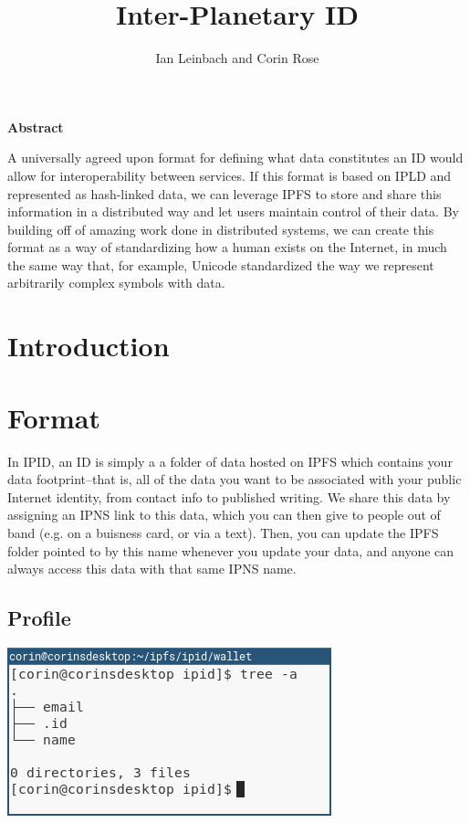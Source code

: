 \documentclass{article}
\author{Ian Leinbach and Corin Rose}
\title{Inter-Planetary ID}
\begin{document}
\maketitle

\begin{center}
\textbf{Abstract} 
\end{center}

A universally agreed upon format for defining what data constitutes an ID would allow for interoperability between services. If this format is based on IPLD and represented as hash-linked data, we can leverage IPFS to store and share this information in a distributed way and let users maintain control of their data. By building off of amazing work done in distributed systems, we can create this format as a way of standardizing how a human exists on the Internet, in much the same way that, for example, Unicode standardized the way we represent arbitrarily complex symbols with data.  

\section{Introduction}

\section{Format}

In IPID, an ID is simply a a folder of data hosted on IPFS which contains your data footprint--that is, all of the data you want to be associated with your public Internet identity, from contact info to published writing. We share this data by assigning an IPNS link to this data, which you can then give to people out of band (e.g. on a buisness card, or via a text). Then, you can update the IPFS folder pointed to by this name whenever you update your data, and anyone can always access this data with that same IPNS name. 

\subsection{Profile}

\begin{center}
  \includegraphics[width=.5\textwidth]{resources/basic_profile.png}
\end{center}
\end{document}

